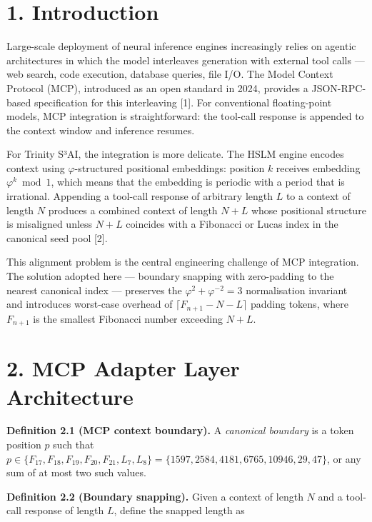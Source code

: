 \section{1. Introduction}\label{fa_23:introduction}

Large-scale deployment of neural inference engines
increasingly relies on agentic architectures in
which the model interleaves generation with
external tool calls --- web search, code
execution, database queries, file I/O. The Model
Context Protocol (MCP), introduced as an open
standard in 2024, provides a JSON-RPC-based
specification for this interleaving [1]. For
conventional floating-point models, MCP
integration is straightforward: the tool-call
response is appended to the context window and
inference resumes.

For Trinity S³AI, the integration is more
delicate. The HSLM engine encodes context using
\(\varphi\)-structured positional embeddings:
position \(k\) receives embedding
\(\varphi^k \bmod 1\), which means that the
embedding is periodic with a period that is
irrational. Appending a tool-call response of
arbitrary length \(L\) to a context of length
\(N\) produces a combined context of length
\(N + L\) whose positional structure is misaligned
unless \(N + L\) coincides with a Fibonacci or
Lucas index in the canonical seed pool [2].

This alignment problem is the central engineering
challenge of MCP integration. The solution adopted
here --- boundary snapping with zero-padding to
the nearest canonical index --- preserves the
\(\varphi^2 + \varphi^{-2} = 3\) normalisation
invariant and introduces worst-case overhead of
\(\lceil F_{n+1} - N - L \rceil\) padding tokens,
where \(F_{n+1}\) is the smallest Fibonacci number
exceeding \(N + L\).

\section{2. MCP Adapter Layer
Architecture}\label{fa_23:mcp-adapter-layer-architecture}

\textbf{Definition 2.1 (MCP context boundary).} A
\emph{canonical boundary} is a token position
\(p\) such that
\(p \in \{F_{17}, F_{18}, F_{19}, F_{20}, F_{21}, L_7, L_8\} = \{1597, 2584, 4181, 6765, 10946, 29, 47\}\),
or any sum of at most two such values.

\textbf{Definition 2.2 (Boundary snapping).} Given
a context of length \(N\) and a tool-call response
of length \(L\), define the snapped length as

